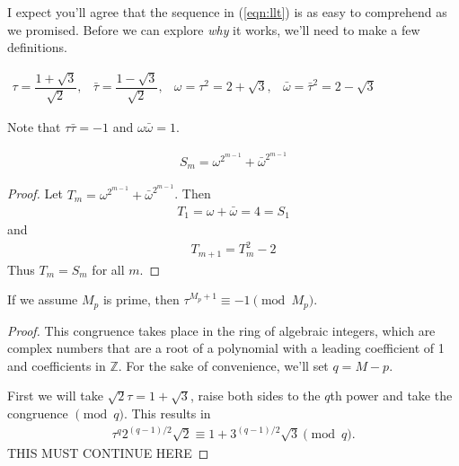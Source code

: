 I expect you'll agree that the sequence in (\ref{eqn:llt}) is as easy to comprehend as we promised.  Before we can explore \emph{why} it works, we'll need to make a few definitions.

\begin{center}
\begin{math}
\begin{array}{cccc}
\tau = \dfrac{1 + \sqrt{3}}{\sqrt{2}},&
\bar{\tau} = \dfrac{1 - \sqrt{3}}{\sqrt{2}},&
\omega = \tau^2 = 2 + \sqrt{3},&
\bar{\omega} = \bar{\tau}^2 = 2 - \sqrt{3}
\end{array}
\end{math}
\end{center}

Note that $\tau\bar{\tau} = -1$ and $\omega\bar{\omega} = 1$.

\begin{lem}
\begin{align*}
S_m = \omega^{2^{m-1}}+ \bar{\omega}^{2^{m-1}}
\end{align*}
\end{lem}
\begin{proof}
Let $T_m = \omega^{2^{m-1}}+ \bar{\omega}^{2^{m-1}}$.  Then 
\begin{align*}
T_1 = \omega + \bar{\omega} = 4 = S_1
\end{align*}
 and 
\begin{align*}
T_{m+1} = T_m^2 -2  
\end{align*}
Thus $T_m = S_m$ for all $m$.
\end{proof}

\begin{lem}
If we assume $M_p$ is prime, then $\tau^{M_p +1} \equiv -1 \pmod{M_p}$. 
\end{lem}
\begin{proof}
This congruence takes place in the ring of algebraic integers, which are complex numbers that are a root of a polynomial with a leading coefficient of 1 and coefficients in $\mathbb{Z}$.  For the sake of convenience, we'll set $q=M-p$.

First we will take $\sqrt{2}\tau = 1 + \sqrt{3}$, raise both sides to the $q$th power and take the congruence $\pmod{q}$. This results in
\begin{align*}
\tau^q2^{(q - 1)/2}\sqrt{2} \equiv 1 + 3^{(q-1)/2}\sqrt{3}\pmod{q}. 
\end{align*}
THIS MUST CONTINUE HERE
\end{proof}



